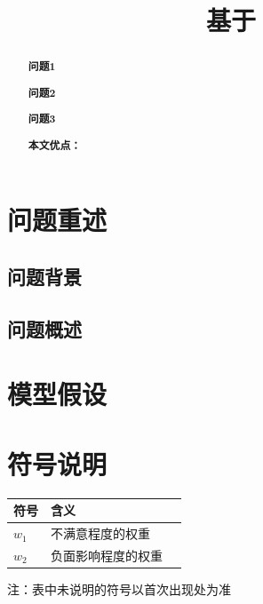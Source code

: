 \documentclass[withoutpreface,bwprint]{cumcmthesis}
\title{基于}
\begin{document}
\maketitle
\thispagestyle{empty}
\begin{abstract}\setlength{\parskip}{0.3\baselineskip}



\textbf{问题1}

\textbf{问题2}

\textbf{问题3}

\textbf{本文优点：}
    \keywords{ \textbf{}  \quad  \textbf{ }  \quad \textbf{} \quad \textbf{}\quad \textbf{}}
\end{abstract}
\thispagestyle{empty}
\tableofcontents
\thispagestyle{empty}
\newpage
\setcounter{page}{1} 




\section{问题重述}
\subsection{问题背景}



\subsection{问题概述}


\section{模型假设}





\section{符号说明}
\begin{table}[!h]
    \centering
    \begin{tabular}{p{2.5cm}<{\centering}p{12cm}<{\centering}p{2.5cm}<{\centering}}
    \toprule[1.5pt]
    符号 & 含义\\
    \midrule[1pt]
    $w_1 $ &  不满意程度的权重    \\
    $w_2 $ &    负面影响程度的权重   \\
   
    \bottomrule[1.5pt]
    \end{tabular}
\end{table}
注：表中未说明的符号以首次出现处为准
\end{document}
